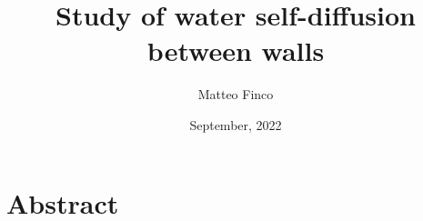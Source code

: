 \documentclass[
	12pt, %
]{fphw}
\title{Study of water self-diffusion between walls} %
\author{Matteo Finco} %
\date{September, 2022} %
\institute{Università degli studi di Padova, Dipartimento di Scienze Chimiche} %
\begin{document}
 
\maketitle %


\section*{Abstract}


\end{document}
